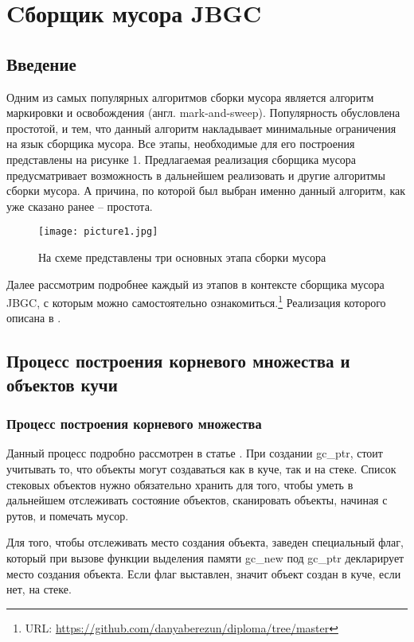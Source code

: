 

\section{Cборщик мусора JBGC}
\subsection{Введение}
Одним из самых популярных алгоритмов сборки мусора является  алгоритм маркировки и освобождения (англ. mark-and-sweep). Популярность обусловлена простотой, и тем, что данный алгоритм накладывает минимальные ограничения на язык сборщика мусора. Все этапы, необходимые для его построения представлены на рисунке 1.  Предлагаемая реализация сборщика мусора предусматривает возможность в дальнейшем реализовать и другие алгоритмы сборки мусора.  А причина, по которой был выбран именно данный алгоритм, как уже сказано ранее -- простота.


\begin{figure}[h!]
	\centering
	\texttt{[image: picture1.jpg]}
	\caption{На схеме представлены три основных этапа сборки мусора}
	\centering
\end{figure}

Далее рассмотрим подробнее каждый из этапов в контексте сборщика мусора JBGC,  с которым можно самостоятельно ознакомиться.\footnote{URL: \url{https://github.com/danyaberezun/diploma/tree/master}} Реализация которого описана в \cite{realisation}.



\subsection{Процесс построения корневого множества и объектов кучи}
\subsubsection{Процесс построения корневого множества}
Данный процесс подробно рассмотрен в статье \cite{roots}.
При создании gc\_ptr, стоит учитывать то, что объекты могут создаваться как в куче, так и на стеке. Список стековых объектов  нужно обязательно хранить для того, чтобы уметь в дальнейшем отслеживать состояние объектов, сканировать объекты, начиная с рутов, и помечать мусор. 

Для того, чтобы отслеживать место создания объекта, заведен специальный флаг, который при вызове функции выделения памяти gc\_new  под gc\_ptr декларирует место создания объекта. Если флаг выставлен, значит объект создан в куче, если нет, на стеке.

